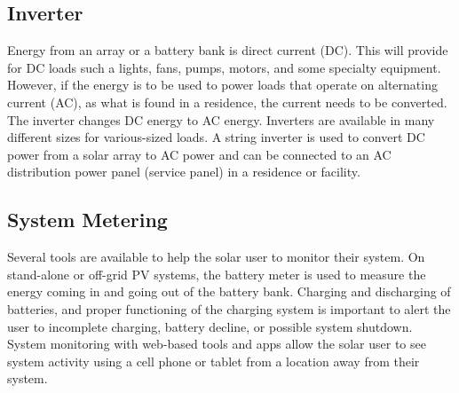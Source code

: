 
\subsection{Inverter}
Energy from an array or a battery bank is direct current
(DC)\cite{pvarizona}. This will provide for DC loads such a lights, fans,
pumps, motors, and some specialty equipment. However,
if the energy is to be used to power loads that operate on
alternating current (AC), as what is found in a residence, the
current needs to be converted. The inverter changes DC energy
to AC energy. Inverters are available in many different sizes
for various-sized loads.
A string inverter is used to convert DC power from a solar
array to AC power and can be connected to an AC distribution
power panel (service panel) in a residence or facility\cite{pvarizona}.


\subsection{System Metering}
Several tools are available to help the solar user to monitor
their system. On stand-alone or off-grid PV systems, the
battery meter is used to measure the energy coming in and
going out of the battery bank. Charging and discharging of
batteries, and proper functioning of the charging system is
important to alert the user to incomplete charging, battery
decline, or possible system shutdown\cite{pvarizona}. System monitoring
with web-based tools and apps allow the solar user to see
system activity using a cell phone or tablet from a location
away from their system.